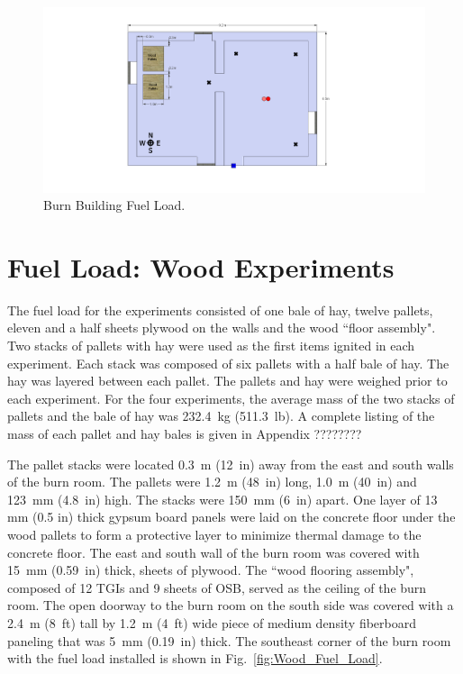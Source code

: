 \documentclass[12pt,oneside]{book}
\begin{document}
\begin{figure}[!ht]
	\includegraphics[width=6in]{../Figures/Pictures/DelCoBurnBuildingFuelLoad}
	\caption{Burn Building Fuel Load.}
	\label{fig:Burn_Building_Fuel_Load}
\end{figure}


\section{Fuel Load: Wood Experiments}
\label{sec:Fuel_Load:_Wood_Experiments} 

The fuel load for the experiments consisted of one bale of hay, twelve pallets, eleven and a half sheets plywood on the walls and the wood ``floor assembly". Two stacks of pallets with hay were used as the first items ignited in each experiment.  Each stack was composed of six pallets with a half bale of hay.  The hay was layered between each pallet.  The pallets and hay were weighed prior to each experiment.  For the four experiments, the average mass of the two stacks of pallets and the bale of hay was 232.4~kg (511.3~lb).  A complete listing of the mass of each pallet and hay bales is given in Appendix ????????
  
The pallet stacks were located 0.3~m (12~in) away from the east and south walls of the burn room.  The pallets were 1.2~m (48~in) long, 1.0~m (40~in) and 123~mm (4.8~in) high.  The stacks were 150~mm (6~in) apart.  One layer of 13 mm (0.5 in) thick gypsum board panels were laid on the concrete floor under the wood pallets to form a protective layer to minimize thermal damage to the concrete floor.
The east and south wall of the burn room was covered with 15~mm (0.59~in) thick, sheets of plywood.  The ``wood flooring assembly", composed of 12 TGIs and 9 sheets of OSB, served as the ceiling of the burn room.  The open doorway to the burn room on the south side was covered with a 2.4~m (8~ft) tall by 1.2~m (4~ft) wide piece of medium density fiberboard paneling that was 5~mm (0.19~in) thick.  The southeast corner of the burn room with the fuel load installed is shown in Fig.~\ref{fig:Wood_Fuel_Load}.
\end{document}

